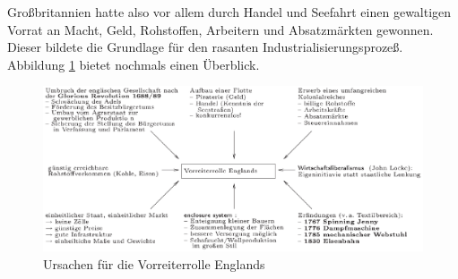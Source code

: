 Großbritannien hatte also vor allem durch Handel und Seefahrt einen
gewaltigen Vorrat an Macht, Geld, Rohstoffen, Arbeitern und
Absatzmärkten gewonnen. Dieser bildete die Grundlage für den rasanten
Industrialisierungsprozeß. Abbildung \ref{pic:vorr-gb-gr} bietet
nochmals einen Überblick.

\begin{figure}
\centering
%
\includegraphics[width=\textwidth]{vorr-gb-gr.eps}
\caption{Ursachen für die Vorreiterrolle Englands}
\label{pic:vorr-gb-gr}
\end{figure}

\endinput
